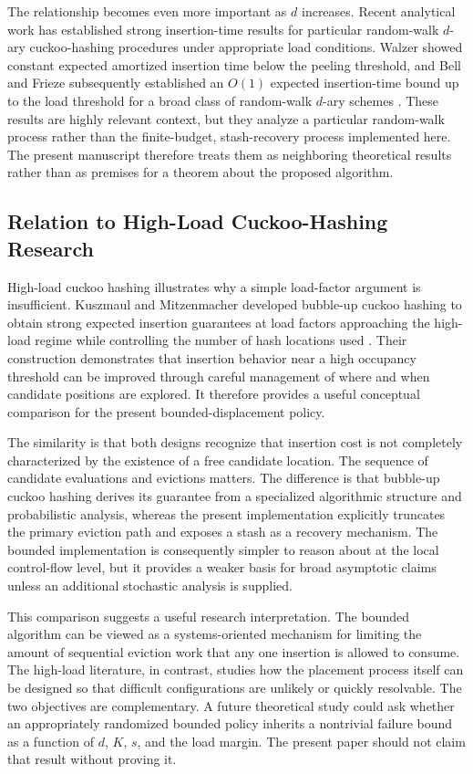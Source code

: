 \documentclass[conference]{IEEEtran}
\begin{document}
The relationship becomes even more important as $d$ increases. Recent
analytical work has established strong insertion-time results for particular
random-walk $d$-ary cuckoo-hashing procedures under appropriate load
conditions. Walzer showed constant expected amortized insertion time below the
peeling threshold, and Bell and Frieze subsequently established an $O(1)$
expected insertion-time bound up to the load threshold for a broad class of
random-walk $d$-ary schemes \cite{walzer2022insertion,bell2024constant}. These
results are highly relevant context, but they analyze a particular random-walk
process rather than the finite-budget, stash-recovery process implemented
here. The present manuscript therefore treats them as neighboring theoretical
results rather than as premises for a theorem about the proposed algorithm.

\subsection{Relation to High-Load Cuckoo-Hashing Research}
\label{subsec:discussion_highload}

High-load cuckoo hashing illustrates why a simple load-factor argument is
insufficient. Kuszmaul and Mitzenmacher developed bubble-up cuckoo hashing to
obtain strong expected insertion guarantees at load factors approaching the
high-load regime while controlling the number of hash locations used
\cite{kuszmaul2025bubbling}. Their construction demonstrates that insertion
behavior near a high occupancy threshold can be improved through careful
management of where and when candidate positions are explored. It therefore
provides a useful conceptual comparison for the present bounded-displacement
policy.

The similarity is that both designs recognize that insertion cost is not
completely characterized by the existence of a free candidate location. The
sequence of candidate evaluations and evictions matters. The difference is
that bubble-up cuckoo hashing derives its guarantee from a specialized
algorithmic structure and probabilistic analysis, whereas the present
implementation explicitly truncates the primary eviction path and exposes a
stash as a recovery mechanism. The bounded implementation is consequently
simpler to reason about at the local control-flow level, but it provides a
weaker basis for broad asymptotic claims unless an additional stochastic
analysis is supplied.

This comparison suggests a useful research interpretation. The bounded
algorithm can be viewed as a systems-oriented mechanism for limiting the
amount of sequential eviction work that any one insertion is allowed to
consume. The high-load literature, in contrast, studies how the placement
process itself can be designed so that difficult configurations are unlikely or
quickly resolvable. The two objectives are complementary. A future theoretical
study could ask whether an appropriately randomized bounded policy inherits a
nontrivial failure bound as a function of $d$, $K$, $s$, and the load margin.
The present paper should not claim that result without proving it.
\end{document}
